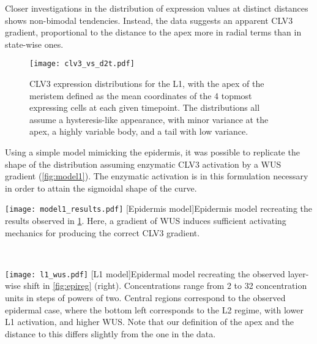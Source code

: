 Closer investigations in the distribution of expression
values at distinct distances shows non-bimodal tendencies. Instead, the data
suggests an apparent CLV3 gradient, proportional to the distance to the apex
more in radial terms than in state-wise ones.

\begin{figure}[H]
  \centering
\texttt{[image: clv3\_vs\_d2t.pdf]}
  \caption[CLV3 distributions]{CLV3 expression distributions for the L1, with the apex of the
    meristem defined as the mean coordinates of the 4 topmost expressing cells
    at each given timepoint. The distributions all assume a hysteresis-like
    appearance, with minor variance at the apex, a highly variable body, and a
    tail with low variance.}
  \label{fig:clv3d2t}
\end{figure}

Using a simple model mimicking the epidermis, it was possible to
replicate the shape of the distribution assuming enzymatic CLV3 activation by a WUS gradient
(\cref{fig:model1}). The enzymatic activation is in this formulation necessary in order to
attain the sigmoidal shape of the curve.

\begin{minipage}{\textwidth}
  \begin{minipage}[t]{0.39\textwidth}
    \centering
    \texttt{[image: model1\_results.pdf]}
    [Epidermis model]{Epidermis model recreating the results
      observed in
      \cref{fig:clv3d2t}. Here, a gradient of WUS induces sufficient
      activating mechanics for producing the correct CLV3 gradient.}
    \label{fig:model1}
  \end{minipage}~~
  \begin{minipage}[t]{.59\textwidth}
    \centering
    \texttt{[image: l1\_wus.pdf]}
    [L1 model]{Epidermal model recreating the observed
      layer-wise shift in \cref{fig:epireg} (right). Concentrations range from
      2 to 32 concentration units in steps of powers of two. Central regions
      correspond to the observed epidermal case, where the bottom left
      corresponds to the L2 regime, with lower L1 activation, and higher WUS.
      Note that our definition of the apex and the distance to this differs
      slightly from the one in the data.}
    \label{fig:model2}
  \end{minipage}
  \vspace{1cm}
\end{minipage}

